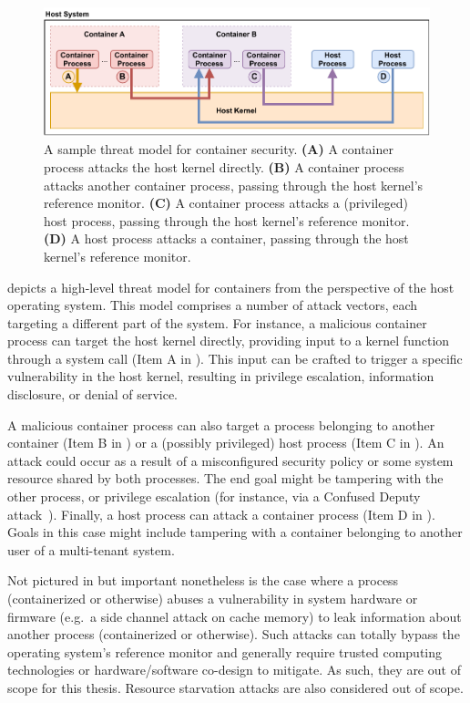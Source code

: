 \documentclass[
  fontsize=12pt,
  titlepage=firstiscover,
  paper=letter,
oneside,
  cleardoublepage=plain,
  parskip=half-,
  DIV=10,
  parindent,
  appendixprefix,
  chapterprefix,
  listof=totoc,
]{scrbook}
\begin{document}
\begin{figure}[htbp]
  \centering
  \includegraphics[width=0.8\linewidth]{figs/background/container_security.pdf}
  \caption[A sample threat model for container security]{
    A sample threat model for container security.
    \textbf{(A)} A container process attacks the host kernel directly.
    \textbf{(B)} A container process attacks another container process, passing through the host kernel's reference monitor.
    \textbf{(C)} A container process attacks a (privileged) host process, passing through the host kernel's reference monitor.
    \textbf{(D)} A host process attacks a container, passing through the host kernel's reference monitor.
  }\label{fig:containersec}
\end{figure}

 depicts a high-level threat model for containers from the
perspective of the host operating system.  This model comprises a number of attack
vectors, each targeting a different part of the system. For instance, a malicious
container process can target the host kernel directly, providing input to a kernel
function through a system call (Item A in ). This input can be
crafted to trigger a specific vulnerability in the host kernel, resulting in privilege
escalation, information disclosure, or denial of service.

A malicious container process can also target a process belonging to another container
(Item B in ) or a (possibly privileged) host process (Item C in
). An attack could occur as a result of a misconfigured security
policy or some system resource shared by both processes. The end goal might be tampering
with the other process, or privilege escalation (for instance, via a Confused Deputy
attack~\cite{hardy1988_confused_deputy}). Finally, a host process can attack a container
process (Item D in ). Goals in this case might include tampering
with a container belonging to another user of a multi-tenant system.

Not pictured in  but important nonetheless is the case where
a process (containerized or otherwise) abuses a vulnerability in system hardware or
firmware (e.g.~a side channel attack on cache memory) to leak information about another
process (containerized or otherwise). Such attacks can totally bypass the operating
system's reference monitor and generally require trusted computing technologies or
hardware/software co-design to mitigate. As such, they are out of scope for this thesis.
Resource starvation attacks are also considered out of scope.
\end{document}
